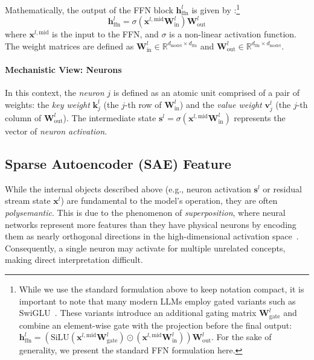\documentclass[11pt,letterpaper]{mystyle}
\begin{document}
Mathematically, the output of the FFN block $\mathbf{h}_{\text{ffn}}^l$ is given by :\footnote{While we use the standard formulation above to keep notation compact, it is important to note that many modern LLMs employ gated variants such as SwiGLU~\citep{shazeer2020gluvariantsimprovetransformer}.
These variants introduce an additional gating matrix $\mathbf{W}_{\text{gate}}^l$ and combine an element-wise gate with the projection before the final output: $\mathbf{h}_{\text{ffn}}^l
    =
    \left(\text{SiLU}(\mathbf{x}^{l,\text{mid}}\mathbf{W}_{\text{gate}}^l)
    \odot
    (\mathbf{x}^{l,\text{mid}}\mathbf{W}_{\text{in}}^l)\right)\mathbf{W}_{\text{out}}^l$. 
For the sake of generality, we present the standard FFN formulation here.}
\begin{equation}
\mathbf{h}_{\text{ffn}}^l = \sigma(\mathbf{x}^{l, \text{mid}} \mathbf{W}_{\text{in}}^l) \mathbf{W}_{\text{out}}^l
\end{equation}
where $\mathbf{x}^{l, \text{mid}}$ is the input to the FFN, and $\sigma$ is a non-linear activation function.
The weight matrices are defined as $\mathbf{W}_{\text{in}}^l \in \mathbb{R}^{d_{\text{model}} \times d_{\text{ffn}}}$ and $\mathbf{W}_{\text{out}}^l \in \mathbb{R}^{d_{\text{ffn}} \times d_{\text{model}}}$. 

\paragraph{Mechanistic View: Neurons}
In this context, the \textit{neuron} $j$ is defined as an atomic unit comprised of a pair of weights: the \textit{key weight} $\mathbf{k}_{j}^l$ (the $j$-th row of $\mathbf{W}_{\text{in}}^l$) and the \textit{value weight} $\mathbf{v}_{j}^l$ (the $j$-th column of $\mathbf{W}_{\text{out}}^l$). The intermediate state $\mathbf{s}^l = \sigma (\mathbf{x}^{l, \text{mid}} \mathbf{W}_{\text{in}}^l)$ represents the vector of \textit{neuron activation}.

\subsection{Sparse Autoencoder (SAE) Feature}
\label{sec:sae_feature}

While the internal objects described above (e.g., neuron activation $\mathbf{s}^l$ or residual stream state $\mathbf{x}^l$) are fundamental to the model's operation, they are often \textit{polysemantic}. This is due to the phenomenon of \textit{superposition}, where neural networks represent more features than they have physical neurons by encoding them as nearly orthogonal directions in the high-dimensional activation space~\citep{elhage2022superposition}. Consequently, a single neuron may activate for multiple unrelated concepts, making direct interpretation difficult.
\end{document}

